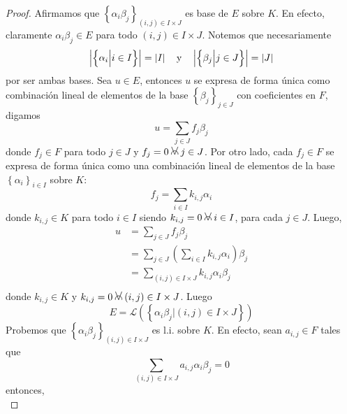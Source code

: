 \documentclass[12pt]{report}
\theoremstyle{largebreak}
\newcommand\abs[1]{\ensuremath{\left|#1\right|}}
\newcommand{\afa}{\:
    \begin{tikzpicture}
        \draw [line width = 0.17 mm, black] (0,0) -- (-0.115,0.29);
        \draw [line width = 0.17 mm, black] (0,0) -- (0.115,0.29);
        \draw [line width = 0.17 mm, black] (-0.12,0) arc (190:-10:0.12cm);
    \end{tikzpicture}
    \:
}
\begin{document}
\begin{proof}
        Afirmamos que $\left\{\alpha_i\beta_j \right\}_{ (i,j)\in I\times J}$ es base de $E$ sobre $K$. En efecto, claramente $\alpha_i\beta_j\in E$ para todo $(i,j)\in I\times J$. Notemos que necesariamente
        \begin{equation*}
            \abs{\left\{\alpha_i\Big|i\in I \right\}}=\abs{I}\quad\textup{y}\quad\abs{\left\{\beta_j\Big|j\in J \right\}}=\abs{J}
        \end{equation*}
        por ser ambas bases. Sea $u\in E$, entonces $u$ se expresa de forma única como combinación lineal de elementos de la base $\left\{\beta_j \right\}_{ j\in J}$ con coeficientes en $F$, digamos
        \begin{equation*}
            u=\sum_{j\in J}f_j\beta_j
        \end{equation*}
        donde $f_j\in F$ para todo $j\in J$ y $f_j=0\afa j\in J$. Por otro lado, cada $f_j\in F$ se expresa de forma única como una combinación lineal de elementos de la base $\left\{\alpha_i\right\}_{ i\in I}$ sobre $K$:
        \begin{equation*}
            f_j=\sum_{ i\in I}k_{ i,j}\alpha_i
        \end{equation*}
        donde $k_{ i,j}\in K$ para todo $i\in I$ siendo $k_{ i,j}=0\afa i\in I$, para cada $j\in J$. Luego,
        \begin{equation*}
            \begin{split}
                u&=\sum_{j\in J}f_j\beta_j\\
                &=\sum_{j\in J}\left( \sum_{ i\in I}k_{ i,j}\alpha_i \right) \beta_j\\
                &=\sum_{(i,j)\in I\times J}k_{ i,j}\alpha_i\beta_j\\
            \end{split}
        \end{equation*}
        donde $k_{ i,j}\in K$ y $k_{ i,j}=0\afa (i,j)\in I\times J$. Luego
        \begin{equation*}
            E=\mathcal{L}\left(\left\{\alpha_i\beta_j\Big|(i,j)\in I\times J \right\} \right)
        \end{equation*}
        Probemos que $\left\{\alpha_i\beta_j \right\}_{ (i,j)\in I\times J}$ es l.i. sobre $K$. En efecto, sean $a_{ i,j}\in F$ tales que
        \begin{equation*}
            \sum_{ (i,j)\in I\times J}a_{ i,j}\alpha_i\beta_j=0
        \end{equation*}
        entonces,
        \begin{equation*}

\end{equation*}
\end{proof}
\end{document}
